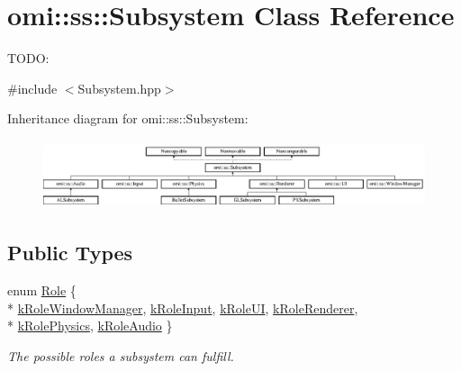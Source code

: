 \hypertarget{classomi_1_1ss_1_1_subsystem}{}\section{omi\+:\+:ss\+:\+:Subsystem Class Reference}
\label{classomi_1_1ss_1_1_subsystem}


T\+O\+DO\+:  




{\ttfamily \#include $<$Subsystem.\+hpp$>$}

Inheritance diagram for omi\+:\+:ss\+:\+:Subsystem\+:\begin{figure}[H]
\begin{center}
\leavevmode
\includegraphics[height=2.025316cm]{classomi_1_1ss_1_1_subsystem}
\end{center}
\end{figure}
\subsection*{Public Types}
\begin{DoxyCompactItemize}
\item 
enum \hyperlink{classomi_1_1ss_1_1_subsystem_a4dd37e93b7d0b1b3926107258d5564f1}{Role} \{ \\*
\hyperlink{classomi_1_1ss_1_1_subsystem_a4dd37e93b7d0b1b3926107258d5564f1af9646235a1a75edc0cb539d696d6496b}{k\+Role\+Window\+Manager}, 
\hyperlink{classomi_1_1ss_1_1_subsystem_a4dd37e93b7d0b1b3926107258d5564f1ab982865b4c50613bc50b4d92216618e9}{k\+Role\+Input}, 
\hyperlink{classomi_1_1ss_1_1_subsystem_a4dd37e93b7d0b1b3926107258d5564f1a3aa5da4a253649009857e6833a9c7816}{k\+Role\+UI}, 
\hyperlink{classomi_1_1ss_1_1_subsystem_a4dd37e93b7d0b1b3926107258d5564f1aef4740e59b246203486209265f60f8c4}{k\+Role\+Renderer}, 
\\*
\hyperlink{classomi_1_1ss_1_1_subsystem_a4dd37e93b7d0b1b3926107258d5564f1adbaebaf1fcbea70c985d2343a6cd5d05}{k\+Role\+Physics}, 
\hyperlink{classomi_1_1ss_1_1_subsystem_a4dd37e93b7d0b1b3926107258d5564f1ac024816ae0332b502039a4fdbe8e38ce}{k\+Role\+Audio}
 \}\begin{DoxyCompactList}\small\item\em The possible roles a subsystem can fulfill. \end{DoxyCompactList}
\end{DoxyCompactItemize}
